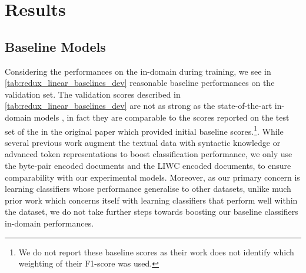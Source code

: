 \section{Results}

\subsection{Baseline Models}
Considering the performances on the in-domain during training, we see in \cref{tab:redux_linear_baselines_dev} reasonable baseline performances on the validation set. The validation scores described in \cref{tab:redux_linear_baselines_dev} are not as strong as the state-of-the-art in-domain models \cite{Salminen:2020}, in fact they are comparable to the scores reported on the test set of the in the original paper \cite{Davidson:2017} which provided initial baseline scores.\footnote{We do not report these baseline scores as their work does not identify which weighting of their F1-score was used.}. While several previous work augment the textual data with syntactic knowledge \cite{Davidson:2017} or advanced token representations \cite{Salminen:2020} to boost classification performance, we only use the byte-pair encoded documents and the LIWC encoded documents, to ensure comparability with our experimental models. Moreover, as our primary concern is learning classifiers whose performance generalise to other datasets, unlike much prior work which concerns itself with learning classifiers that perform well within the dataset, we do not take further steps towards boosting our baseline classifiers in-domain performances.

